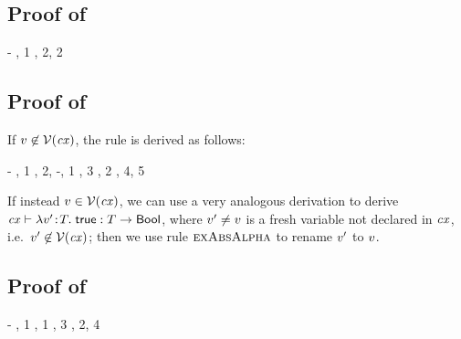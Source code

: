 \subsection*{Proof of }

\begin{derivation}
\step{\cxwfO}
     {\hyp}
\step{\hastyO{\abs{\varfx}{\bool}{\varfx}}{\tarr{\bool}{\bool}}}
     {\Reidbool, 1}
\step{\hastyO{(\eq{\abs{\varfx}{\bool}{\varfx}}{\abs{\varfx}{\bool}{\varfx}})}
             {\bool}}
     {\Reeq, 2, 2}
\end{derivation}



\subsection*{Proof of }

If $v\not\in\mathcal{V}(\mathit{cx})$, the rule is derived as follows:
\begin{derivation}
\step{\istyO{\typ}}
     {\hyp}
\step{\cxwfO}
     {, 1}
\step{\cxwf{\snoc{\cx}{\vdec{\var}{\typ}}}}
     {\Rcxvdec, 2, \hyp, 1}
\step{\hasty{\snoc{\cx}{\vdec{\var}{\typ}}}{\true}{\bool}}
     {\Retrue, 3}
\step{\istyO{\bool}}
     {\Rtbool, 2}
\step{\hastyO{\abs{\var}{\typ}{\true}}{\tarr{\typ}{\bool}}}
     {\Reabs, 4, 5}
\end{derivation}
If instead $v\in\mathcal{V}(\mathit{cx})$, we can use a very analogous derivation to
derive $\mathit{cx}\vdash\lambda v'\!:\!T.\;\mathsf{true}:T\to\mathsf{Bool}$, where
$v'\neq v$ is a fresh variable not declared in $\mathit{cx}$, i.e.\
$v'\not\in\mathcal{V}(\mathit{cx})$; then we use rule $\textsc{exAbsAlpha}$ to rename $v'$ to
$v$.



\subsection*{Proof of }

\begin{derivation}
\step{\cxwfO}
     {\hyp}
\step{\hastyO{\abs{\varfx}{\bool}{\varfx}}{\tarr{\bool}{\bool}}}
     {\Reidbool, 1}
\step{\istyO{\bool}}
     {\Rtbool, 1}
\step{\hastyO{\abs{\varfx}{\bool}{\true}}{\tarr{\bool}{\bool}}}
     {\Reconsttrue, 3}
\step{\hastyO{(\eq{\abs{\varfx}{\bool}{\varfx}}{\abs{\varfx}{\bool}{\true}})}
             {\bool}}
     {\Reeq, 2, 4}
\end{derivation}



